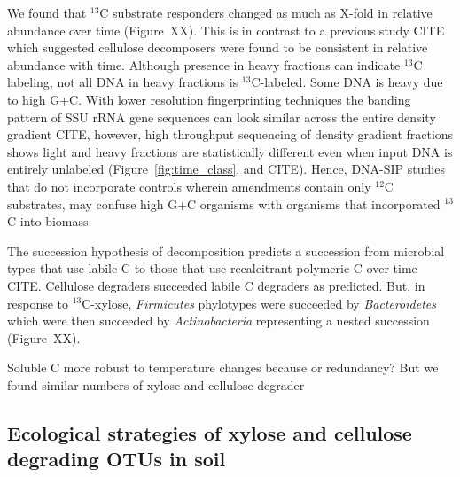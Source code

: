 We found that $^{13}$C substrate responders changed as much as X-fold in
relative abundance over time (Figure~XX). This is in contrast to
a previous study CITE which suggested cellulose decomposers were found to
be consistent in relative abundance with time. Although presence in heavy
fractions can indicate $^{13}$C labeling, not all DNA in heavy fractions
is $^{13}$C-labeled. Some DNA is heavy due to high G+C.
With lower resolution fingerprinting techniques the banding pattern of SSU
rRNA gene sequences can look similar across the entire density gradient
CITE, however, high throughput sequencing of density gradient fractions
shows light and heavy fractions are statistically different even when
input DNA is entirely unlabeled (Figure~\ref{fig:time_class}, and CITE).
Hence, DNA-SIP studies that do not incorporate controls wherein amendments
contain only $^{12}$C substrates, may confuse high G+C organisms with
organisms that incorporated $^{13}$C into biomass. 

The succession hypothesis of decomposition predicts a succession from
microbial types that use labile C to those that use recalcitrant polymeric
C over time CITE. Cellulose degraders succeeded labile C degraders as
predicted. But, in response to $^{13}$C-xylose,  \textit{Firmicutes}
phylotypes were succeeded by \textit{Bacteroidetes} which were then
succeeded by \textit{Actinobacteria} representing a nested succession
(Figure~XX). 

Soluble C more robust to temperature changes because or redundancy? But we
found similar numbers of xylose and cellulose degrader
\subsection{Ecological strategies of xylose and cellulose degrading OTUs in
    soil}
